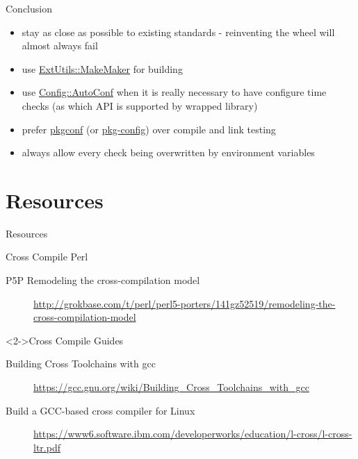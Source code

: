 \documentclass[ngerman,xcolor={table,dvipsnames},smaller,compress,hyperref={bookmarks,colorlinks}]{beamer}%
\begin{document}
\begin{frame}[fragile]{Conclusion}
\begin{block}{}
\begin{itemize}
\item stay as close as possible to existing standards - reinventing the wheel will almost always fail
\item<2-> use \href{https://metacpan.org/release/ExtUtils-MakeMaker}{ExtUtils::MakeMaker} for building
\item<3-> use \href{https://metacpan.org/release/Config-AutoConf}{Config::AutoConf} when it is really necessary to have configure time checks (as which API is supported by wrapped library)
\item<3-> prefer \href{https://github.com/pkgconf/pkgconf}{pkgconf} (or \href{https://en.wikipedia.org/wiki/Pkg-config}{pkg-config}) over compile and link testing
\item<4-> always allow every check being overwritten by environment variables
\end{itemize}
\end{block}
\end{frame}

\section{Resources}

\begin{frame}[fragile]{Resources}
\begin{block}{Cross Compile Perl}
\begin{description}
\item[\lbrack{}P5P\rbrack{} Remodeling the cross-compilation model] \url{http://grokbase.com/t/perl/perl5-porters/141gz52519/remodeling-the-cross-compilation-model}
\end{description}
\end{block}
\begin{block}<2->{Cross Compile Guides}
\begin{description}
\item[Building Cross Toolchains with gcc] \url{https://gcc.gnu.org/wiki/Building_Cross_Toolchains_with_gcc}
\item[Build a GCC-based cross compiler for Linux] \url{https://www6.software.ibm.com/developerworks/education/l-cross/l-cross-ltr.pdf}
\end{description}
\end{block}
\end{frame}
\end{document}
